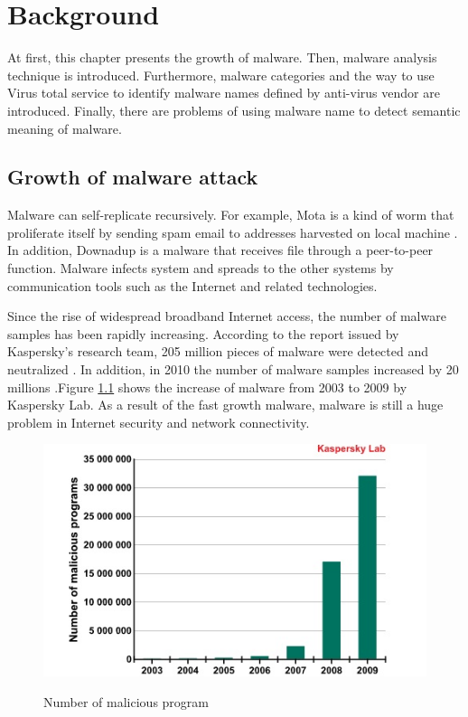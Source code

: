 
\chapter{Background}\label{chap:2}
At first, this chapter presents the growth of malware. Then, malware analysis technique is introduced. Furthermore, malware categories and the way to use Virus total service to identify malware names defined by anti-virus vendor are introduced. Finally, there are problems of using malware name to detect semantic meaning of malware. 
%
%
\section{Growth of malware attack}
Malware can self-replicate recursively. For example, Mota is a kind of worm that proliferate	itself by sending spam email to addresses harvested on local machine \cite{mota}. In addition, Downadup is a malware that receives file through a peer-to-peer function\cite{downadup}. Malware infects system and spreads to the other systems by communication tools such as the Internet and related technologies. 

Since the rise of widespread broadband Internet access, the number of malware samples has been rapidly increasing. According to the report issued by Kaspersky's research team, 205 million pieces of malware were detected and neutralized \cite{kaspersky1}. In addition, in 2010 the number of malware samples increased by 20 millions \cite{kaspersky}.Figure \ref{fig:kaspersky} shows the increase of malware from 2003 to 2009 by Kaspersky Lab. As a result of the fast growth malware, malware is still a huge problem in Internet security and network connectivity. 
\begin{figure}[h!]
\centering
\includegraphics[width=1\textwidth]{graph/kapersky.jpg}
\caption{Number of malicious program}\cite{kaspersky}
\label{fig:kaspersky}
\end{figure}

